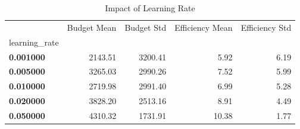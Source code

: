\begin{table}
\caption{Impact of Learning Rate}
\label{tab:learning_rate}
\begin{tabular}{lrrrr}
\toprule
 & Budget Mean & Budget Std & Efficiency Mean & Efficiency Std \\
learning_rate &  &  &  &  \\
\midrule
\textbf{0.001000} & 2143.51 & 3200.41 & 5.92 & 6.19 \\
\textbf{0.005000} & 3265.03 & 2990.26 & 7.52 & 5.99 \\
\textbf{0.010000} & 2719.98 & 2991.40 & 6.99 & 5.28 \\
\textbf{0.020000} & 3828.20 & 2513.16 & 8.91 & 4.49 \\
\textbf{0.050000} & 4310.32 & 1731.91 & 10.38 & 1.77 \\
\bottomrule
\end{tabular}
\end{table}
